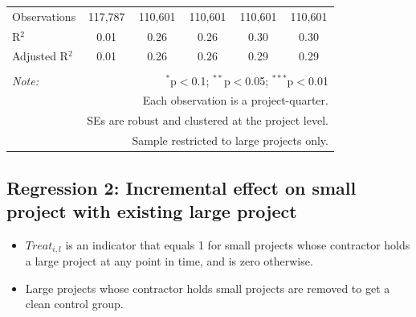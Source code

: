 \documentclass[
]{article}
\providecommand{\tightlist}{%
  \setlength{\itemsep}{0pt}\setlength{\parskip}{0pt}}
\begin{document}
\begin{table}[H]
\begin{tabular}{@{\extracolsep{-10pt}}lccccc}
Observations & 117,787 & 110,601 & 110,601 & 110,601 & 110,601 \\ 
R$^{2}$ & 0.01 & 0.26 & 0.26 & 0.30 & 0.30 \\ 
Adjusted R$^{2}$ & 0.01 & 0.26 & 0.26 & 0.29 & 0.29 \\ 
\hline 
\hline \\[-1.8ex] 
\textit{Note:}  & \multicolumn{5}{r}{$^{*}$p$<$0.1; $^{**}$p$<$0.05; $^{***}$p$<$0.01} \\ 
 & \multicolumn{5}{r}{Each observation is a project-quarter.} \\ 
 & \multicolumn{5}{r}{SEs are robust and clustered at the project level.} \\ 
 & \multicolumn{5}{r}{Sample restricted to large projects only.} \\ 
\end{tabular} 
\end{table}

\hypertarget{regression-2-incremental-effect-on-small-project-with-existing-large-project}{%
\subsection{Regression 2: Incremental effect on small project with
existing large
project}\label{regression-2-incremental-effect-on-small-project-with-existing-large-project}}

\begin{itemize}
\tightlist
\item
  \(Treat_{i,l}\) is an indicator that equals 1 for small projects whose
  contractor holds a large project at any point in time, and is zero
  otherwise.
\item
  Large projects whose contractor holds small projects are removed to
  get a clean control group.
\end{itemize}
\end{document}
